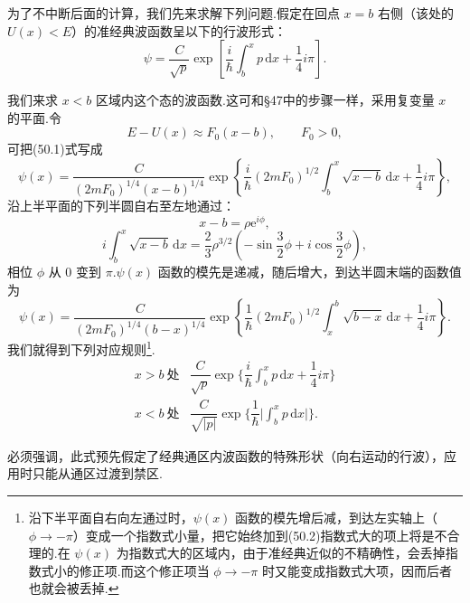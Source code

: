 为了不中断后面的计算，我们先来求解下列问题.假定在回点 $x=b$ 右侧（该处的 $U(x)<E$）的准经典波函数呈以下的行波形式：
\begin{equation}
  \psi=\frac{C}{\sqrt{p}}\exp\left[\frac{i}{\hbar}\int_b^x p\,\mathrm{d}x+\frac{1}{4}i\pi\right].
\end{equation}

我们来求 $x<b$ 区域内这个态的波函数.这可和§47中的步骤一样，采用复变量 $x$ 的平面.令
\begin{equation*}
  E-U(x)\approx F_0(x-b),\qquad F_0>0,
\end{equation*}
可把(50.1)式写成
\begin{equation*}
  \psi(x)=\frac{C}{(2mF_0)^{1/4}(x-b)^{1/4}}
  \exp\left\{\frac{i}{\hbar}(2mF_0)^{1/2}\int_b^x\sqrt{x-b}\,\mathrm{d}x+\frac{1}{4}i\pi\right\},
\end{equation*}
沿上半平面的下列半圆自右至左地通过：
\begin{equation*}
  x-b=\rho\mathrm{e}^{i\phi},
\end{equation*}
\begin{equation*}
  i\int_b^x\sqrt{x-b}\,\mathrm{d}x
  =\frac{2}{3}\rho^{3/2}\left(-\sin\frac{3}{2}\phi+i\cos\frac{3}{2}\phi\right),
\end{equation*}
相位 $\phi$ 从 0 变到 $\pi$.$\psi(x)$ 函数的模先是递减，随后增大，到达半圆末端的函数值为
\begin{equation*}
  \psi(x)=\frac{C}{(2mF_0)^{1/4}(b-x)^{1/4}}
  \exp\left\{\frac{1}{\hbar}(2mF_0)^{1/2}\int_x^b\sqrt{b-x}\,\mathrm{d}x+\frac{1}{4}i\pi\right\}.
\end{equation*}
我们就得到下列对应规则\footnote{沿下半平面自右向左通过时，$\psi(x)$ 函数的模先增后减，到达左实轴上（$\phi\to-\pi$）变成一个指数式小量，把它始终加到(50.2)指数式大的项上将是不合理的.在 $\psi(x)$ 为指数式大的区域内，由于准经典近似的不精确性，会丢掉指数式小的修正项.而这个修正项当 $\phi\to-\pi$ 时又能变成指数式大项，因而后者也就会被丢掉.}.
\begin{equation}
\begin{array}{ll}
  x>b\ \text{处} &
  \dfrac{C}{\sqrt{p}}\exp\Big\{\dfrac{i}{\hbar}\int_b^x p\,\mathrm{d}x
  +\dfrac{1}{4}i\pi\Big\}\\[2ex]
  x<b\ \text{处} &
  \dfrac{C}{\sqrt{|p|}}\exp\Big\{\dfrac{1}{\hbar}
  \Big|\int_b^x p\,\mathrm{d}x\Big|\Big\}.
\end{array}
\end{equation}

必须强调，此式预先假定了经典通区内波函数的特殊形状（向右运动的行波），应用时只能从通区过渡到禁区.

